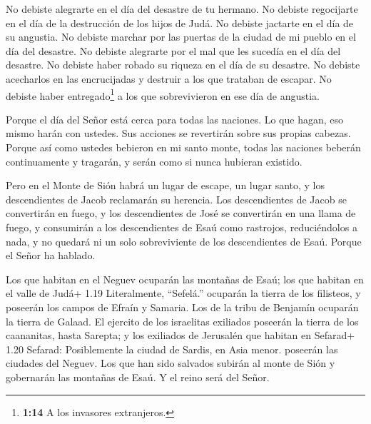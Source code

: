  No debiste alegrarte en el día del desastre de tu hermano.
No debiste regocijarte en el día de la destrucción de los hijos de Judá.
No debiste jactarte en el día de su angustia.  No debiste
marchar por las puertas de la ciudad de mi pueblo en el día del
desastre. No debiste alegrarte por el mal que les sucedía en el día del
desastre. No debiste haber robado su riqueza en el día de su desastre.
 No debiste acecharlos en las encrucijadas y destruir a los
que trataban de escapar. No debiste haber entregado\footnote{\textbf{1:14}
  A los invasores extranjeros.} a los que sobrevivieron en ese día de
angustia.

 Porque el día del Señor está cerca para todas las
naciones. Lo que hagan, eso mismo harán con ustedes. Sus acciones se
revertirán sobre sus propias cabezas.  Porque así como
ustedes bebieron en mi santo monte, todas las naciones beberán
continuamente y tragarán, y serán como si nunca hubieran existido.

 Pero en el Monte de Sión habrá un lugar de escape, un
lugar santo, y los descendientes de Jacob reclamarán su herencia.
 Los descendientes de Jacob se convertirán en fuego, y los
descendientes de José se convertirán en una llama de fuego, y consumirán
a los descendientes de Esaú como rastrojos, reduciéndolos a nada, y no
quedará ni un solo sobreviviente de los descendientes de Esaú. Porque el
Señor ha hablado.

 Los que habitan en el Neguev ocuparán las montañas de
Esaú; los que habitan en el valle de Judá+ 1.19 Literalmente,
``Sefelá.'' ocuparán la tierra de los filisteos, y poseerán los campos
de Efraín y Samaria. Los de la tribu de Benjamín ocuparán la tierra de
Galaad.  El ejercito de los israelitas exiliados poseerán
la tierra de los caananitas, hasta Sarepta; y los exiliados de Jerusalén
que habitan en Sefarad+ 1.20 Sefarad: Posiblemente la ciudad de Sardis,
en Asia menor. poseerán las ciudades del Neguev.  Los que
han sido salvados subirán al monte de Sión y gobernarán las montañas de
Esaú. Y el reino será del Señor.
